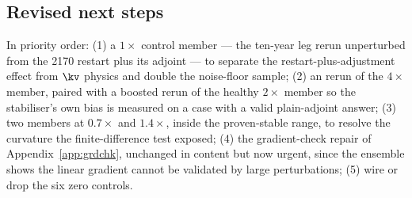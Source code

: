\subsection{Revised next steps}
\label{sec:results-next}

In priority order: (1) a $1\times$ control member --- the ten-year leg rerun
unperturbed from the 2170 restart plus its adjoint --- to separate the
restart-plus-adjustment effect from $\kv$ physics and double the noise-floor
sample; (2) an  rerun of the $4\times$ member, paired with
a boosted rerun of the healthy $2\times$ member so the stabiliser's own bias is
measured on a case with a valid plain-adjoint answer; (3) two members at
$0.7\times$ and $1.4\times$, inside the proven-stable range, to resolve the
curvature the finite-difference test exposed; (4) the gradient-check repair of
Appendix~\ref{app:grdchk}, unchanged in content but now urgent, since the
ensemble shows the linear gradient cannot be validated by large perturbations;
(5) wire or drop the six zero controls.
